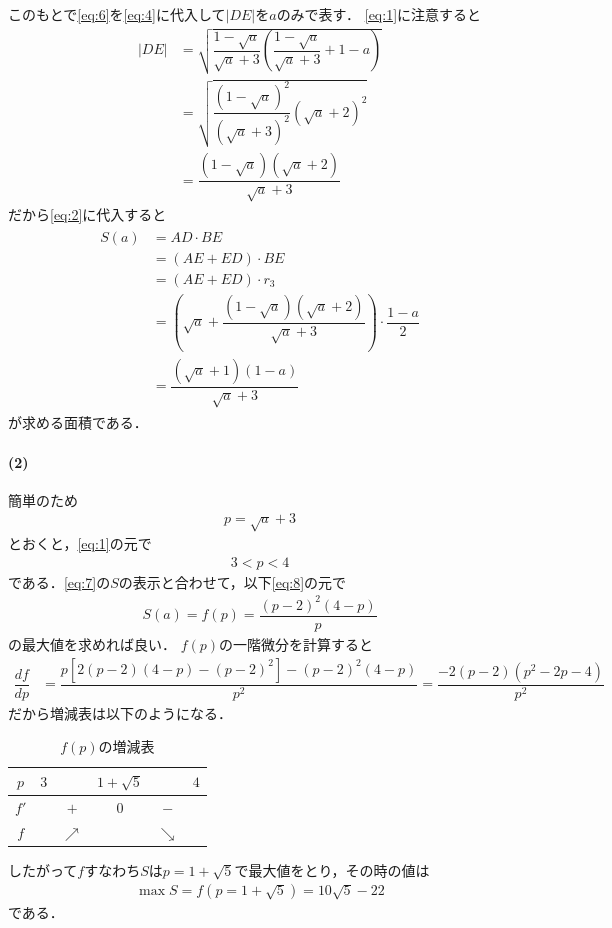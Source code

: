 \documentclass[../../main.tex]{subfiles}
\begin{document}
このもとで\cref{eq:6}を\cref{eq:4}に代入して$|DE|$を$a$のみで表す．
\cref{eq:1}に注意すると
\begin{align}
  |DE|
  &=\sqrt{\dfrac{1-\sqrt{a}}{\sqrt{a}+3}\left(\dfrac{1-\sqrt{a}}{\sqrt{a}+3}+1-a\right)} \\
  &=\sqrt{\dfrac{(1-\sqrt{a})^2}{(\sqrt{a}+3)^2}(\sqrt{a}+2)^2} \\
  &=\dfrac{(1-\sqrt{a})(\sqrt{a}+2)}{\sqrt{a}+3}
\end{align}
だから\cref{eq:2}に代入すると
\begin{align}
  \begin{split}
    S(a)
    &=AD\cdot BE \\
    &=(AE+ED)\cdot BE \\
    &=\left(AE+ED\right)\cdot r_3 \\
    &=\left(\sqrt{a}+\dfrac{(1-\sqrt{a})(\sqrt{a}+2)}{\sqrt{a}+3}\right)\cdot\dfrac{1-a}{2} \\
    &=\dfrac{(\sqrt{a}+1)(1-a)}{\sqrt{a}+3}
  \end{split}\label{eq:7}
\end{align}
が求める面積である．

\paragraph{(2)}
簡単のため
\begin{align}
  p = \sqrt{a}+3
\end{align}
とおくと，\cref{eq:1}の元で
\begin{align}
  3 < p < 4 \label{eq:8}
\end{align}
である．\cref{eq:7}の$S$の表示と合わせて，以下\cref{eq:8}の元で
\begin{align}
  S(a) = f(p) = \dfrac{(p-2)^2(4-p)}{p}
\end{align}
の最大値を求めれば良い．
$f(p)$の一階微分を計算すると
\begin{align}
  \dfrac{df}{dp}&=\dfrac{p[2(p-2)(4-p)-(p-2)^2]-(p-2)^2(4-p)}{p^2}=\dfrac{-2(p-2)(p^2-2p-4)}{p^2}
\end{align}
だから増減表は以下のようになる．

\begin{table}[htb]
  \centering
  \caption{$f(p)$の増減表}
  \begin{tabular}{c|ccccc}
    $p$ & $3$ & & $1+\sqrt{5}$ & & $4$ \\
    \hline
    $f'$ & & $+$ & $0$ & $-$ & \\
    \hline
    $f$ & & $\nearrow$ & & $\searrow$ &
  \end{tabular}
\end{table}
したがって$f$すなわち$S$は$p=1+\sqrt{5}$で最大値をとり，その時の値は
\begin{align}
  \max S = f(p=1+\sqrt{5}) = 10\sqrt{5}-22
\end{align}
である．

\newpage
\end{document}
